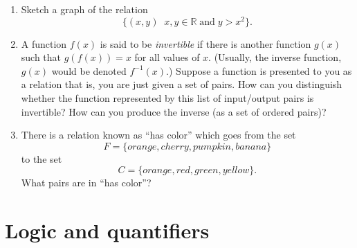 \documentclass[10pt,]{book}
\theoremstyle{plain}
\theoremstyle{definition}
\theoremstyle{definition}
\numberwithin{equation}{section}
\newcommand{\hint}[1]{ }
\newcommand{\suchthat}{\;  \;}
\newcommand{\Reals}{{\mathbb R}}
\begin{document}
\begin{enumerate}[label=(\alph*)]
{          }
\item\hypertarget{li-104}{}
          Sketch a graph of the relation
          \begin{equation*}
            \{ (x,y) \suchthat x,y \in \Reals \; \mbox{and}  \; y > x^2 \}.
          \end{equation*}
          \hint{Is this the region above or below the curve \(y=x^2\)?}
\item\hypertarget{li-105}{}
          A function \(f(x)\) is said to be  
          \emph{invertible} if there is another function \(g(x)\) such that 
          \(g(f(x)) = x\) for all values of \(x\).  (Usually, the inverse function,
          \(g(x)\) would be denoted \(f^{-1}(x)\).)   Suppose a function is presented 
          to you as a relation \textemdash{} that is, you are just given a set of pairs.  
          How can you distinguish whether the function represented by this list 
          of input/output pairs is invertible?  How can you produce the inverse 
          (as a set of ordered pairs)?
 
          \hint{If \(f\) sends \(x\) to \(y\), then we want \(f^{-1}\) to send \(y\) back to \(x\).  So the inverse just has the pairs in \(f\) reversed.  When is the inverse going to fail to be a function?}
\item\hypertarget{li-106}{}
          There is a relation known as ``has color'' which goes from the
          set
          \begin{equation*}
            F = \{orange, cherry, pumpkin, banana\}
          \end{equation*}
          to the set
          \begin{equation*}
            C = \{orange, red, green, yellow\}.
          \end{equation*}
          What pairs are in ``has color''?
   
          \hint{Depending on your personal experience level with fruit there may be different answers.  Certainly
          (orange, orange) will be one of the pairs, but (orange, green) happens too!}
\end{enumerate}
\typeout{************************************************}
\typeout{************************************************}
\chapter[{Logic and quantifiers}]{Logic and quantifiers}\label{ch_logic}
\typeout{************************************************}
\typeout{************************************************}
\end{document}
